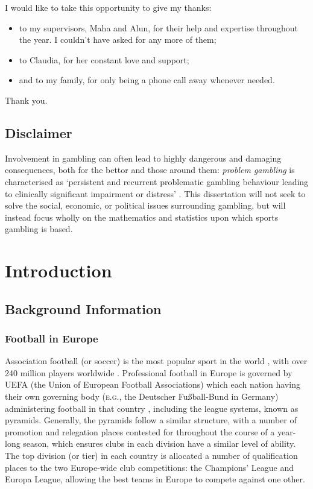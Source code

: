 \documentclass[a4paper,10pt]{report}
\begin{document}
I would like to take this opportunity to give my thanks:
\begin{itemize}
	\item to my supervisors, Maha and Alun, for their help and expertise throughout the year. I couldn't have asked for any more of them; 
	\item to Claudia, for her constant love and support;
	\item and to my family, for only being a phone call away whenever needed.
\end{itemize}

\begin{center}Thank you.\end{center}

\pagebreak
\tableofcontents
\listoffigures
\listoftables
\listofalgorithms
\pagebreak

\section{Disclaimer} \label{disclaimer}
\thispagestyle{empty}
Involvement in gambling can often lead to highly dangerous and damaging consequences, both for the bettor and those around them: \textit{problem gambling} is characterised as `persistent and recurrent problematic gambling behaviour leading to clinically significant impairment or distress' \autocite{Dsm5}. This dissertation will not seek to solve the social, economic, or political issues surrounding gambling, but will instead focus wholly on the mathematics and statistics upon which sports gambling is based.

\chapter{Introduction} \label{ch:intro}

\section{Background Information} \label{sec:bginfo}
\subsection{Football in Europe} \label{sec:footballineurope}
Association football (or soccer) is the most popular sport in the world \autocite{Giulianotti12}, with over 240 million players worldwide \autocite{FifaSurvey01}. Professional football in Europe is governed by UEFA (the Union of European Football Associations) which each nation having their own governing body (\textsc{e.g.}, the Deutscher Fu{\ss}ball-Bund in Germany) administering football in that country \autocite{UefaMembers}, including the league systems, known as pyramids. Generally, the pyramids follow a similar structure, with a number of promotion and relegation places contested for throughout the course of a year-long season, which ensures clubs in each division have a similar level of ability. The top division (or tier) in each country is allocated a number of qualification places to the two Europe-wide club competitions: the Champions' League and Europa League, allowing the best teams in Europe to compete against one other.
\end{document}
